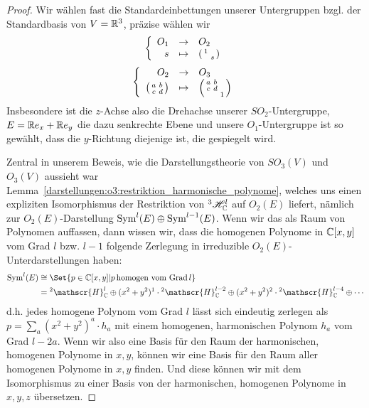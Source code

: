 \begin{proof}
Wir wählen fast die Standardeinbettungen unserer Untergruppen bzgl. der Standardbasis von $V=\mathbb{R}^3$, präzise wählen wir
\[\left\lbrace\begin{array}{rcl}
O_1 &\to& O_2 \\
s &\mapsto& \begin{psmallmatrix}1 &\\ & s \end{psmallmatrix}
\end{array}\right.\]
\[\left\lbrace\begin{array}{rcl}
O_2 &\to& O_3 \\
\begin{psmallmatrix}a&b\\c&d\end{psmallmatrix} &\mapsto& \begin{psmallmatrix}a&b&\\c&d&\\& & 1 \end{psmallmatrix}
\end{array}\right.\]
Insbesondere ist die $z$-Achse also die Drehachse unserer $SO_2$-Untergruppe, $E=\mathbb{R} e_x + \mathbb{R} e_y$ die dazu senkrechte Ebene und unsere $O_1$-Untergruppe ist so gewählt, dass die $y$-Richtung diejenige ist, die gespiegelt wird.

\medbreak
Zentral in unserem Beweis, wie die Darstellungstheorie von $SO_3(V)$ und $O_3(V)$ aussieht war Lemma~\ref{darstellungen:o3:restriktion_harmonische_polynome}, welches uns einen expliziten Isomorphismus der Restriktion von ${^3} \mathscr{H}_{\mathbb{C}}^l$ auf $O_2(E)$ liefert, nämlich zur $O_2(E)$-Darstellung $\operatorname{Sym}^l(E)\oplus\operatorname{Sym}^{l-1}(E)$. Wenn wir das als Raum von Polynomen auffassen, dann wissen wir, dass die homogenen Polynome in $\mathbb{C}[x,y]$ vom Grad $l$ bzw. $l-1$ folgende Zerlegung in irreduzible $O_2(E)$-Unterdarstellungen haben:
\begin{align*}
\Sym^l(E) &\isomorphic \Set{p \in\IC[x,y] | p\,\text{homogen vom Grad}\,l} \\
&= {^2\mathscr{H}_\IC^l} \oplus (x^2+y^2)^1\cdot {^2 \mathscr{H}_\IC^{l-2}} \oplus (x^2+y^2)^2\cdot {^2 \mathscr{H}_\IC^{l-4}}\oplus\cdots
\end{align*}
d.h. jedes homogene Polynom vom Grad $l$ lässt sich eindeutig zerlegen als $p=\sum_a (x^2+y^2)^a \cdot h_a$ mit einem homogenen, harmonischen Polynom $h_a$ vom Grad $l-2a$. Wenn wir also eine Basis für den Raum der harmonischen, homogenen Polynome in $x,y$, können wir eine Basis für den Raum aller homogenen Polynome in $x,y$ finden. Und diese können wir mit dem Isomorphismus zu einer Basis von der harmonischen, homogenen Polynome in $x,y,z$ übersetzen.


\end{proof}
